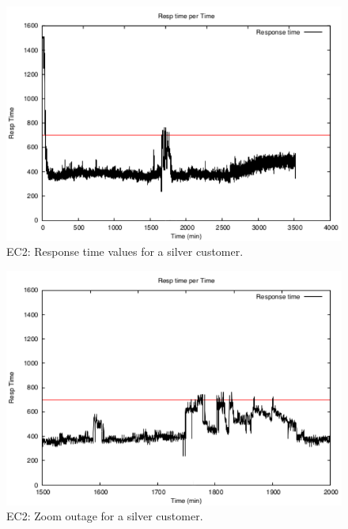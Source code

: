 \begin{figure}
  \begin{center}
    \includegraphics[width=.85\linewidth]{images/exps2011/medium/ec2/proxyDataPoints_output.pdf}
  \end{center}
\vspace{-5mm}
  \caption{EC2: Response time values for a silver customer.}
  \label{mediumResponseTime}
\end{figure}

\begin{figure}
  \begin{center}
    \includegraphics[width=.85\linewidth]{images/exps2011/medium/ec2/proxyDataPoints_output_filtered.pdf}
  \end{center}
\vspace{-5mm}
  \caption{EC2: Zoom outage for a silver customer.}
  \label{zoomOutage}
\end{figure}

